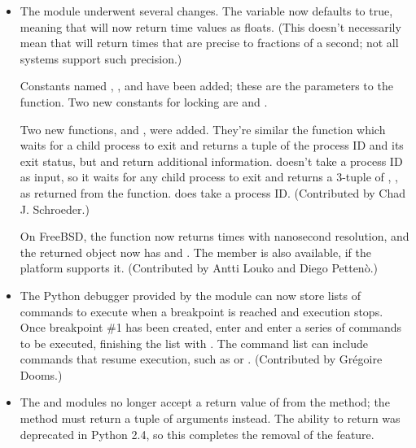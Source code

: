 \documentclass{howto}
\begin{document}
\begin{itemize}
\item The  module underwent several changes.  The
 variable now defaults to true, meaning that
 will now return time values as floats.  (This
doesn't necessarily mean that  will return times
that are precise to fractions of a second; not all systems support
such precision.)

Constants named , , and
 have been added; these are the parameters to the
 function.  Two new constants for locking are
 and .

Two new functions,  and , were
added.  They're similar the  function which waits
for a child process to exit and returns a tuple of the process ID and
its exit status, but  and  return
additional information.   doesn't take a process ID
as input, so it waits for any child process to exit and returns a
3-tuple of , , 
as returned from the  function.
 does take a process ID.
(Contributed by Chad J. Schroeder.)

On FreeBSD, the  function now returns 
times with nanosecond resolution, and the returned object
now has  and .
The  member is also available, if the platform supports it.
(Contributed by Antti Louko and  Diego Petten\`o.)

\item The Python debugger provided by the  module
can now store lists of commands to execute when a breakpoint is
reached and execution stops.  Once breakpoint \#1 has been created,
enter  and enter a series of commands to be executed,
finishing the list with .  The command list can include
commands that resume execution, such as  or
.  (Contributed by Gr\'egoire Dooms.)

\item The  and  modules no
longer accept a return value of  from the
 method; the method must return a tuple of
arguments instead.  The ability to return  was deprecated
in Python 2.4, so this completes the removal of the feature.


\end{itemize}
\end{document}
